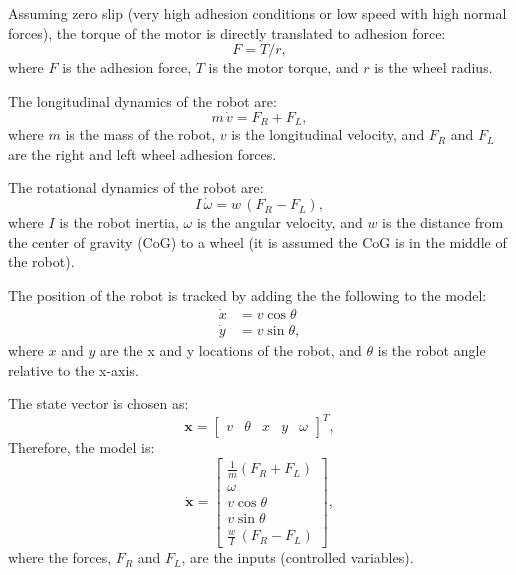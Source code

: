 \documentclass[12pt]{article}
\numberwithin{equation}{section} %
\numberwithin{figure}{section} %
\begin{document}
Assuming zero slip (very high adhesion conditions or low speed with high normal forces), the torque of the motor is directly translated to adhesion force:
\begin{equation}\label{eq:Force}
	F = T / r,
\end{equation}
where $F$ is the adhesion force, $T$ is the motor torque, and $r$ is the wheel radius.

The longitudinal dynamics of the robot are:
\begin{equation}
	m \, \dot v = F_R + F_L,
\end{equation}
where $m$ is the mass of the robot, $v$ is the longitudinal velocity, and $F_R$ and $F_L$ are the right and left wheel adhesion forces.

The rotational dynamics of the robot are:
\begin{equation}
	I \, \dot \omega = w \, (F_R - F_L),
\end{equation}
where $I$ is the robot inertia, $\omega$ is the angular velocity, and $w$ is the distance from the center of gravity (CoG) to a wheel (it is assumed the CoG is in the middle of the robot).

The position of the robot is tracked by adding the the following to the model:
\begin{align}
	\dot x &= v \cos \theta \\
	\dot y &= v \sin \theta,
\end{align}
where $x$ and $y$ are the x and y locations of the robot, and $\theta$ is the robot angle relative to the x-axis.

The state vector is chosen as:
\begin{equation}
	\boldsymbol{x} = \begin{bmatrix}
		v & \theta & x & y & \omega
	\end{bmatrix}^T,
\end{equation}
Therefore, the model is:
\begin{equation}
	\boldsymbol{\dot x} = \begin{bmatrix}
		\frac{1}{m} (F_R + F_L) \\
		\omega \\
		v \cos \theta \\
		v \sin \theta \\
		\frac{w}{I} \, (F_R - F_L)
	\end{bmatrix},
\end{equation}
where the forces, $F_R$ and $F_L$, are the inputs (controlled variables).
\end{document}
